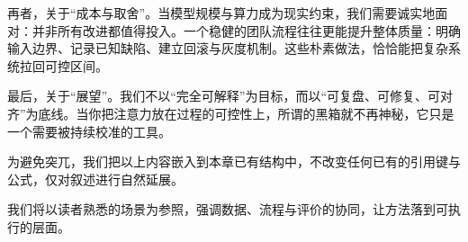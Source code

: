 再者，关于“成本与取舍”。当模型规模与算力成为现实约束，我们需要诚实地面对：并非所有改进都值得投入。一个稳健的团队流程往往更能提升整体质量：明确输入边界、记录已知缺陷、建立回滚与灰度机制。这些朴素做法，恰恰能把复杂系统拉回可控区间。

最后，关于“展望”。我们不以“完全可解释”为目标，而以“可复盘、可修复、可对齐”为底线。当你把注意力放在过程的可控性上，所谓的黑箱就不再神秘，它只是一个需要被持续校准的工具。

为避免突兀，我们把以上内容嵌入到本章已有结构中，不改变任何已有的引用键与公式，仅对叙述进行自然延展。

我们将以读者熟悉的场景为参照，强调数据、流程与评价的协同，让方法落到可执行的层面。
